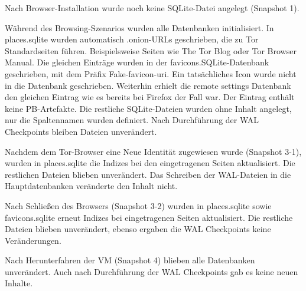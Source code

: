 \begin{appendices}
\begin{table}[h!]
{\begin{tabular}{|l|c|cc|cc|cc|cc|}
\end{tabular}
}
\end{table}

Nach Browser-Installation wurde noch keine SQLite-Datei angelegt (Snapshot 1).

Während des Browsing-Szenarios wurden alle Datenbanken initialisiert.
In places.sqlite wurden automatisch .onion-URLs geschrieben, die zu Tor Standardseiten führen. Beispielsweise Seiten wie \glqq{}The Tor Blog\grqq{} oder \glqq{}Tor Browser Manual\grqq{}.
Die gleichen Einträge wurden in der favicons.SQLite-Datenbank geschrieben, mit dem Präfix \glqq{}Fake-favicon-uri\grqq{}. Ein tatsächliches Icon wurde nicht in die Datenbank geschrieben. 
Weiterhin erhielt die \glqq{}remote settings\grqq{} Datenbank den gleichen Eintrag wie es bereits bei Firefox der Fall war. Der Eintrag enthält keine PB-Artefakte.
Die restliche SQLite-Dateien wurden ohne Inhalt angelegt, nur die Spaltennamen wurden definiert.
Nach Durchführung der WAL Checkpoints bleiben Dateien unverändert.

Nachdem dem Tor-Browser eine \glqq{}Neue Identität\grqq{} zugewiesen wurde (Snapshot 3-1), wurden in places.sqlite die Indizes bei den eingetragenen Seiten aktualisiert. Die restlichen Dateien blieben unverändert. Das Schreiben der WAL-Dateien in die Hauptdatenbanken veränderte den Inhalt nicht.

Nach Schließen des Browsers (Snapshot 3-2) wurden in places.sqlite sowie favicons.sqlite erneut Indizes bei eingetragenen Seiten aktualisiert. Die restliche Dateien blieben unverändert, ebenso ergaben die WAL Checkpoints keine Veränderungen.

Nach Herunterfahren der VM (Snapshot 4) blieben alle Datenbanken unverändert. Auch nach Durchführung der WAL Checkpoints gab es keine neuen Inhalte.


\end{appendices}
